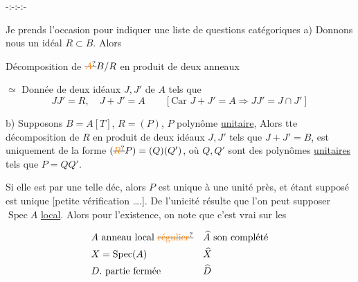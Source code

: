 \begin{center}-:-:-:-\end{center}

Je prends l'occasion pour indiquer une liste de questions catégoriques
a) Donnons nous un idéal $R\subset B$. Alors

Décomposition de $\deleted{\unsure{A}}B/R$ en produit de deux anneaux

$\simeq$ Donnée de deux idéaux $J,J'$ de $A$ tels que
\[
JJ'=R,\quad J+J'=A\qquad [\text{Car }J+J'=A\Rightarrow JJ'=J\cap J']
\]

b) Supposons $B=A[T]$,  $R=(P)$, $P$ polynôme
\uline{unitaire}, Alors tte décomposition de $R$ en
produit de deux idéaux $J,J'$ tels que $J+J'=B$,
est uniquement de la forme $(\deleted{\unsure{R}}P)=(Q)(Q')$, où
$Q,Q'$ sont des polynômes \uline{unitaires} tels que
$P=QQ'$.

Si elle est  par une telle déc,
alors $P$ est unique à une unité près,
et étant supposé  est unique
\deleted{[N.B. tout} [petite vérification \ldots.].  De l'unicité résulte que
l'on peut supposer $\operatorname{Spec} A$ \uline{local}. Alors pour
l'existence, on note que c'est vrai sur les

\[
\begin{aligned}
&A\ \text{anneau local }\deleted{\unsure{\text{régulier}}} && \widehat A\ \text{son complété}\\
&X=\operatorname{Spec}(A) && \widehat X\\
&D.\ \text{partie fermée} && \widehat D
\end{aligned}
\]

